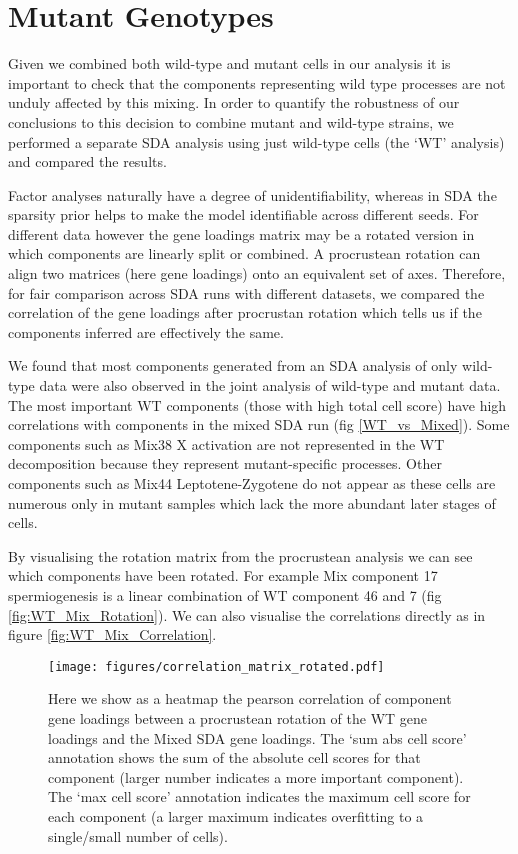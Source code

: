 \section{Mutant Genotypes}

Given we combined both wild-type and mutant cells in our analysis it is important to check that the components representing wild type processes are not unduly affected by this mixing. In order to quantify the robustness of our conclusions to this decision to combine mutant and wild-type strains, we performed a separate SDA analysis using just wild-type cells (the ‘WT’ analysis) and compared the results.

Factor analyses naturally have a degree of unidentifiability, whereas in SDA the sparsity prior helps to make the model identifiable across different seeds. For different data however the gene loadings matrix may be a rotated version in which components are linearly split or combined. A procrustean rotation can align two matrices (here gene loadings) onto an equivalent set of axes. Therefore, for fair comparison across SDA runs with different datasets, we compared the correlation of the gene loadings after procrustan rotation which tells us if the components inferred are effectively the same.

We found that most components generated from an SDA analysis of only wild-type data were also observed in the joint analysis of wild-type and mutant data. The most important WT components (those with high total cell score) have high correlations with components in the mixed SDA run (fig \ref{WT_vs_Mixed}). Some components such as Mix38 X activation are not represented in the WT decomposition because they represent mutant-specific processes. Other components such as Mix44 Leptotene-Zygotene do not appear as these cells are numerous only in mutant samples which lack the more abundant later stages of cells.

By visualising the rotation matrix from the procrustean analysis we can see which components have been rotated. For example Mix component 17 spermiogenesis is a linear combination of WT component 46 and 7 (fig \ref{fig:WT_Mix_Rotation}). We can also visualise the correlations directly as in figure \ref{fig:WT_Mix_Correlation}.

\begin{figure}[H]
	\centering
	\texttt{[image: figures/correlation\_matrix\_rotated.pdf]}
	\caption{Here we show as a heatmap the pearson correlation of component gene loadings between a procrustean rotation of the WT gene loadings and the Mixed SDA gene loadings. The ‘sum abs cell score’ annotation shows the sum of the absolute cell scores for that component (larger number indicates a more important component). The ‘max cell score’ annotation indicates the maximum cell score for each component (a larger maximum indicates overfitting to a single/small number of cells).}
	\label{fig:WT_vs_Mixed}
\end{figure}

